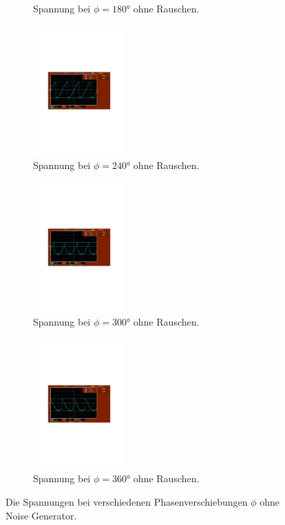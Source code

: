 \begin{figure}
\begin{subfigure}{0.48\textwidth}
      \caption{Spannung bei $\phi = 180°$ ohne Rauschen.}
  \end{subfigure}
\hfill 
  \begin{subfigure}{0.48\textwidth}
      \centering
      \includegraphics[height=5cm]{content/abbildungen/ohne/240.pdf}
      \caption{Spannung bei $\phi = 240°$ ohne Rauschen.}
      \end{subfigure}
\hfill 
  \begin{subfigure}{0.48\textwidth}
      \centering
      \includegraphics[height=5cm]{content/abbildungen/ohne/300.pdf}
      \caption{Spannung bei $\phi = 300°$ ohne Rauschen.}
      \end{subfigure}
\hfill 
  \begin{subfigure}{0.48\textwidth}
      \centering
      \includegraphics[height=5cm]{content/abbildungen/ohne/360.pdf}
      \caption{Spannung bei $\phi = 360°$ ohne Rauschen.}
      \end{subfigure}
\caption{Die Spannungen bei verschiedenen Phasenverschiebungen $\phi$ ohne Noise Generator.}
\end{figure}


